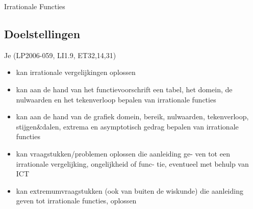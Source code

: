 \documentclass[12pt,twoside]{article}
\begin{document}
\begin{center}
  \begin{mdframed}
    \centering
    \fontsize{40}{60}\selectfont Irrationale Functies
  \end{mdframed}
  \vfill
  \vfill
\end{center}

\subsection*{Doelstellingen}
\vspace*{-0.8cm}
\begin{singlespacing}
  Je \hfill  {\scriptsize(LP2006-059, LI1.9, ET32,14,31)}
  \begin{itemize}
    \itemsep-0.2em
  \item kan irrationale vergelijkingen oplossen
  \item kan aan de hand van het functievoorschrift een tabel, het domein, de nulwaarden en het tekenverloop bepalen van irrationale functies
  \item kan aan de hand van de grafiek domein, bereik, nulwaarden, tekenverloop, stijgen\&dalen, extrema en asymptotisch gedrag bepalen van irrationale functies
  \item kan vraagstukken/problemen oplossen die aanleiding ge-
    ven tot een irrationale vergelijking, ongelijkheid of func-
    tie, eventueel met behulp van ICT
  \item kan extremumvraagstukken (ook van buiten de wiskunde)
    die aanleiding geven tot irrationale functies, oplossen
  \end{itemize}
\end{singlespacing}
\end{document}

